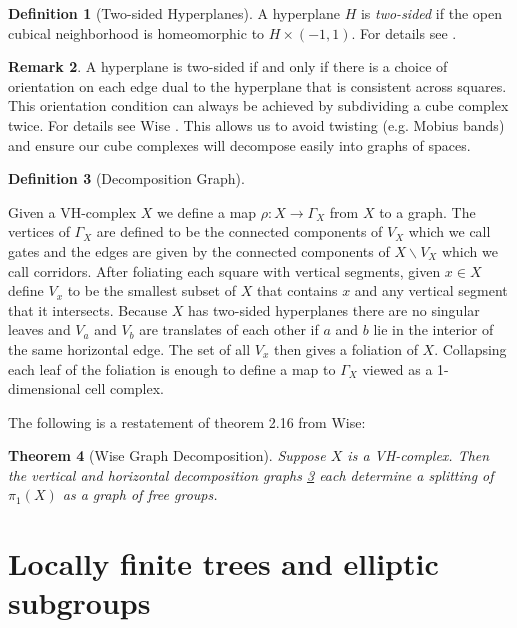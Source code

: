 \documentclass[12pt,parskip=full]{report}
\theoremstyle{plain}
\newtheorem{thm}{Theorem}[section]
\theoremstyle{definition}
\newtheorem{rmk}[thm]{Remark}
\newtheorem{dfn}[thm]{Definition}
\begin{document}
\begin{dfn}
    [Two-sided Hyperplanes]
    A hyperplane \(H\) is \emph{two-sided} if the open cubical neighborhood is homeomorphic to \(H\times (-1,1)\). For details see \cite{haglundwise}.
\end{dfn}

\begin{rmk}
    A hyperplane is two-sided if and only if there is a choice of orientation on each edge dual to the hyperplane that is consistent across squares. This orientation condition can always be achieved by subdividing a cube complex twice. For details see Wise \cite{wisecsc}. This allows us to avoid twisting (e.g. Mobius bands) and ensure our cube complexes will decompose easily into graphs of spaces.
\end{rmk}

\begin{dfn}
    [Decomposition Graph]
    \label{dfn:decompositiongraph}
    
    Given a VH-complex \(X\) we define a map \(\rho: X\to \Gamma_X\) from \(X\) to a graph. The vertices of \(\Gamma_X\) are defined to be the connected components of \(V_X\) which we call gates and the edges are given by the connected components of \(X\smallsetminus V_X\) which we call corridors. After foliating each square with vertical segments, given \(x\in X\) define \(V_x\) to be the smallest subset of \(X\) that contains \(x\) and any vertical segment that it intersects. Because \(X\) has two-sided hyperplanes there are no singular leaves and \(V_a\) and \(V_b\) are translates of each other if \(a\) and \(b\) lie in the interior of the same horizontal edge. The set of all \(V_x\) then gives a foliation of \(X\). Collapsing each leaf of the foliation is enough to define a map to \(\Gamma_X\) viewed as a 1-dimensional cell complex. 
\end{dfn}

The following is a restatement of theorem 2.16 \cite{wisethesis} from Wise:
\begin{thm}[Wise Graph Decomposition]
\label{thm:wisegraph}
Suppose \(X\) is a VH-complex. Then the vertical and horizontal decomposition graphs \ref{dfn:decompositiongraph} each determine a splitting of \(\pi_1(X)\) as a graph of free groups. 
\end{thm}

\chapter{Locally finite trees and elliptic subgroups}
\end{document}
